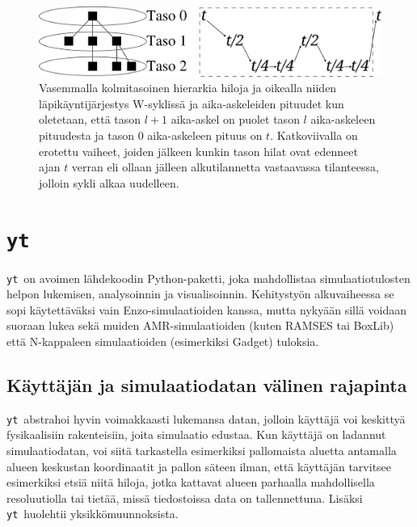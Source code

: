 \documentclass[12pt,a4paper]{article}
\newcommand{\yt}{\texttt{yt}}
\begin{document}
\begin{figure}
   \centering
   \includegraphics[width=\textwidth]{../kuvat/W-cycle.png}
   \caption{Vasemmalla kolmitasoinen hierarkia hiloja ja oikealla niiden läpikäyntijärjestys W-syklissä ja aika-askeleiden pituudet kun oletetaan, että tason $l+1$ aika-askel on puolet tason $l$ aika-askeleen pituudesta ja tason $0$ aika-askeleen pituus on $t$. Katkoviivalla on erotettu vaiheet, joiden jälkeen kunkin tason hilat ovat edenneet ajan $t$ verran eli ollaan jälleen alkutilannetta vastaavassa tilanteessa, jolloin sykli alkaa uudelleen.}\label{fig:w-cycle} %
\end{figure}




\section{\yt}
\yt\ on avoimen lähdekoodin Python-paketti, joka mahdollistaa simulaatiotulosten helpon lukemisen, analysoinnin ja visualisoinnin. Kehitystyön alkuvaiheessa se sopi käytettä\-väksi vain Enzo-simulaatioiden kanssa, mutta nykyään sillä voidaan suoraan lukea sekä muiden AMR-simulaatioiden (kuten RAMSES tai BoxLib) että N-kappaleen simulaatioiden (esimerkiksi Gadget) tuloksia. \cite{yt}

\subsection{Käyttäjän ja simulaatiodatan välinen rajapinta}
\yt\ abstrahoi hyvin voimakkaasti lukemansa datan, jolloin käyttäjä voi keskittyä fysikaalisiin rakenteisiin, joita simulaatio edustaa. Kun käyttäjä on ladannut simulaatiodatan, voi siitä tarkastella esimerkiksi pallomaista aluetta antamalla alueen keskustan koordinaatit ja pallon säteen ilman, että käyttäjän tarvitsee esimerkiksi etsiä niitä hiloja, jotka kattavat alueen parhaalla mahdollisella resoluutiolla tai tietää, missä tiedostoissa data on tallennettuna. Lisäksi \yt\ huolehtii yksikkömuunnoksista. \cite{yt}
\end{document}
